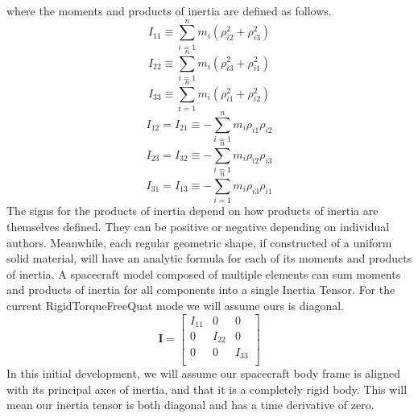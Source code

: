 %
where the moments and products of inertia are defined as follows.
%
\begin{equation}
    I_{11} \equiv \sum_{i=1}^{n} m_i ( \rho_{i2}^2 + \rho_{i3}^2 )
    \label{Eq:Moment11}
\end{equation}
%
\begin{equation}
    I_{22} \equiv \sum_{i=1}^{n} m_i ( \rho_{i3}^2 + \rho_{i1}^2 )
    \label{Eq:Moment22}
\end{equation}
%
\begin{equation}
    I_{33} \equiv \sum_{i=1}^{n} m_i ( \rho_{i1}^2 + \rho_{i2}^2 )
    \label{Eq:Moment33}
\end{equation}
%
\begin{equation}
    I_{12} = I_{21} \equiv -\sum_{i=1}^{n} m_i \rho_{i1} \rho_{i2}
    \label{Eq:Product12}
\end{equation}
%
\begin{equation}
    I_{23} = I_{32} \equiv -\sum_{i=1}^{n} m_i \rho_{i2} \rho_{i3}
    \label{Eq:Product23}
\end{equation}
%
\begin{equation}
    I_{31} = I_{13} \equiv -\sum_{i=1}^{n} m_i \rho_{i3} \rho_{i1}
    \label{Eq:Product31}
\end{equation}
%
The signs for the products of inertia depend on how products of inertia are
themselves defined.  They can be positive or negative depending on individual
authors.  Meanwhile, each regular geometric shape, if constructed of a uniform
solid material, will have an analytic formula for each of its moments and
products of inertia.  A spacecraft model composed of multiple elements can sum
moments and products of inertia for all components into a single Inertia Tensor.
For the current RigidTorqueFreeQuat mode we will assume ours is diagonal.
%
\begin{equation}
    \mathbf{I} =
        \begin{bmatrix}
        I_{11} &    0   &    0   \\
           0   & I_{22} &    0   \\
           0   &    0   & I_{33} \\
        \end{bmatrix}
    \label{Eq:DiagonalInertiaTensor}
\end{equation}
%
In this initial development, we will assume our spacecraft body frame is aligned
with its principal axes of inertia, and that it is a completely rigid body.  This
will mean our inertia tensor is both diagonal and has a time derivative of zero.
